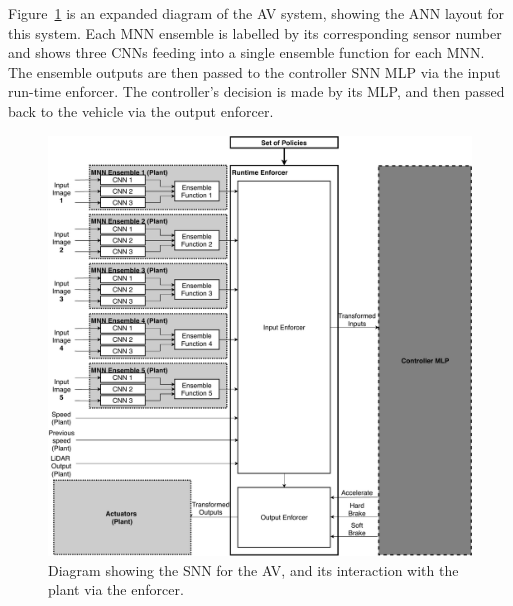 Figure~\ref{fig:avmnn} is an expanded diagram of the \ac{AV} system, showing the \ac{ANN} layout for this system.
Each \ac{MNN} ensemble is labelled by its corresponding sensor number and shows three \acp{CNN} feeding into a single ensemble function for each \ac{MNN}.
The ensemble outputs are then passed to the controller \ac{SNN} \ac{MLP} via the input run-time enforcer.
The controller's decision is made by its \ac{MLP}, and then passed back to the vehicle via the output enforcer.

\begin{figure}[H]
	\centering
	\includegraphics[width=\textwidth]{Content/fig/AV-MNN.pdf}
	\caption{Diagram showing the \ac{SNN} for the \ac{AV}, and its interaction with the plant via the enforcer. \label{fig:avmnn}}
\end{figure}



